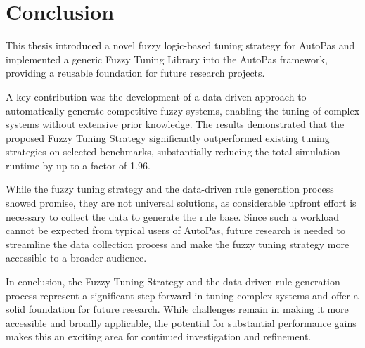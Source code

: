 \chapter{Conclusion}
\label{sec:conclusion}

This thesis introduced a novel fuzzy logic-based tuning strategy for AutoPas and implemented a generic Fuzzy Tuning Library into the AutoPas framework, providing a reusable foundation for future research projects.

A key contribution was the development of a data-driven approach to automatically generate competitive fuzzy systems, enabling the tuning of complex systems without extensive prior knowledge. The results demonstrated that the proposed Fuzzy Tuning Strategy significantly outperformed existing tuning strategies on selected benchmarks, substantially reducing the total simulation runtime by up to a factor of 1.96.

While the fuzzy tuning strategy and the data-driven rule generation process showed promise, they are not universal solutions, as considerable upfront effort is necessary to collect the data to generate the rule base. Since such a workload cannot be expected from typical users of AutoPas, future research is needed to streamline the data collection process and make the fuzzy tuning strategy more accessible to a broader audience.

\bigskip

\noindent In conclusion, the Fuzzy Tuning Strategy and the data-driven rule generation process represent a significant step forward in tuning complex systems and offer a solid foundation for future research. While challenges remain in making it more accessible and broadly applicable, the potential for substantial performance gains makes this an exciting area for continued investigation and refinement.